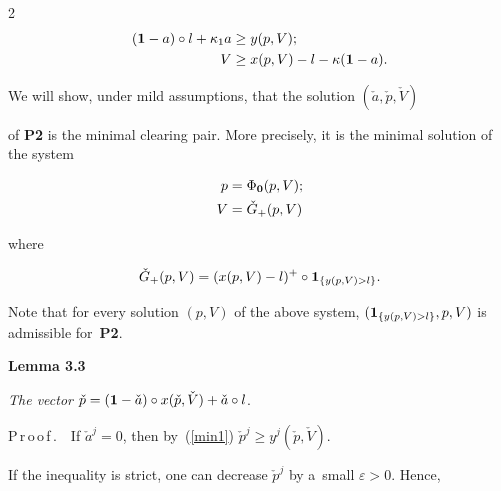 \begin{multicols}{2}
\begin{align}
\label{min3}

 ( {\bf 1} - a) \circ l  + \kappa_1 a &\geq y(p,V) ; \\

\label{min4}

 V& \geq x(p,V) - l - \kappa({\bf 1} - a).

\end{align}





 We will show, under mild assumptions, that the solution $(\check a, \check p, \check V)$ 

 of {\bf P2} is the minimal clearing pair. More precisely, it is the minimal solution of the system 

\begin{align}

    \label{min_eq1}

    p &= \Phi_{\bf 0} (p, V); \\

    \label{min_eq2}

    V &= \check G_+(p, V)

\end{align}

where 

$$

\check G_+ (p, V) = (x(p,V) - l)^+ \circ {\bf 1}_{\{y(p,V)> l\}}.

$$





Note that  for every solution $( p,  V)$ of the above system, $({\bf 1}_{\{y(p,V)> l\}}, p, V)$ is admissible for~\textbf{P2}.



\smallskip



\noindent

\textbf{Lemma 3.3}\

\textit{The vector} $\check p = ({\bf 1} - \check a) \circ x(\check p, \check V) +  \check a \circ l$.



\smallskip



\noindent

P\,r\,o\,o\,f\,.\ \ If $\check a^j = 0$, then by~(\ref{min1}) $\check p^j \geq y^j(\check p,\check V)$.

 If the inequality is strict, one can decrease $\check p^j$ by a~small $\varepsilon>0$. Hence, 


\end{multicols}

